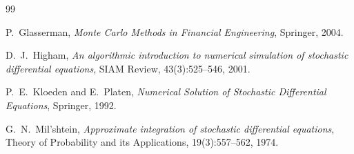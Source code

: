 \documentclass[11pt,a4paper]{article}
\theoremstyle{plain}
\theoremstyle{definition}
\theoremstyle{remark}
\begin{document}
\begin{thebibliography}{99}

P.\ Glasserman,
\emph{Monte Carlo Methods in Financial Engineering},
Springer, 2004.

D.\ J.\ Higham,
\emph{An algorithmic introduction to numerical simulation of
stochastic differential equations},
SIAM Review, 43(3):525--546, 2001.

P.\ E.\ Kloeden and E.\ Platen,
\emph{Numerical Solution of Stochastic Differential Equations},
Springer, 1992.

G.\ N.\ Mil'shtein,
\emph{Approximate integration of stochastic differential equations},
Theory of Probability and its Applications, 19(3):557--562, 1974.

\end{thebibliography}
\end{document}
